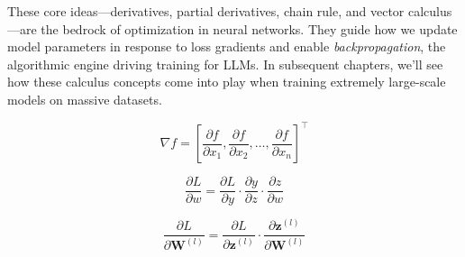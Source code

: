 \noindent
These core ideas—derivatives, partial derivatives, chain rule, and vector calculus—are the bedrock of optimization in neural networks. They guide how we update model parameters in response to loss gradients and enable \emph{backpropagation}, the algorithmic engine driving training for LLMs. In subsequent chapters, we’ll see how these calculus concepts come into play when training extremely large-scale models on massive datasets. 

\begin{equation}\label{eq:gradient}
\nabla f = \left[\frac{\partial f}{\partial x_1}, \frac{\partial f}{\partial x_2}, \ldots, \frac{\partial f}{\partial x_n}\right]^\top
\end{equation}

\begin{equation}\label{eq:chain_rule}
\frac{\partial L}{\partial w} = \frac{\partial L}{\partial y} \cdot \frac{\partial y}{\partial z} \cdot \frac{\partial z}{\partial w}
\end{equation}

\begin{equation}\label{eq:backprop}
\frac{\partial L}{\partial \mathbf{W}^{(l)}} = \frac{\partial L}{\partial \mathbf{z}^{(l)}} \cdot \frac{\partial \mathbf{z}^{(l)}}{\partial \mathbf{W}^{(l)}}
\end{equation} 
